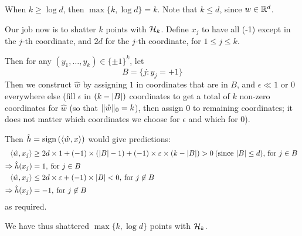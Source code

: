 \documentclass[a4paper, 12pt]{article}
\begin{document}
\begin{problem} [Problem 4]
When $k \geq \log d$, then $ \max\{k, \log d\} = k$. Note that $k \leq d$, since $w \in \mathbb{R}^d$.

Our job now is to shatter $k$ points with $\mathcal{H}_k$. Define $x_j$ to have all (-1) except in the $j$-th coordinate, and $2d$ for the $j$-th coordinate, for $1 \leq j \leq k$.

Then for any $(y_1, \ldots, y_k) \in \{\pm 1\}^k$, let \begin{equation*}
B = \{j : y_j = +1\}
\end{equation*}
Then we construct $\hat{w}$ by assigning $1$ in coordinates that are in $B$, and $\epsilon \ll 1$ or 0 everywhere else (fill $\epsilon$ in $(k-\lvert B\rvert)$ coordinates to get a total of $k$ non-zero coordinates for $\hat{w}$ (so that $\lVert\hat{w}\rVert_0 = k$), then assign 0 to remaining coordinates; it does not matter which coordinates we choose for $\epsilon$ and which for $0$).

Then $\hat{h} = \mathrm{sign}\left(\langle \hat{w}, x \rangle\right)$ would give predictions:
\begin{align*}
    \langle \hat{w}, x_j \rangle &\geq 2d \times 1 + (-1) \times (\lvert B\rvert - 1) + (-1) \times \varepsilon \times (k - \lvert B\rvert) > 0 \:\text{(since $\lvert B\rvert \leq d$), for $j \in B$}\: \\
    \Rightarrow \hat{h}(x_j) &= 1, \:\text{for $j \in B$}\: \\
    \langle \hat{w}, x_j \rangle&\leq 2d \times \varepsilon + (-1) \times \lvert B\rvert < 0,  \:\text{for $j \not \in B$}\:  \\
    \Rightarrow \hat{h}(x_j) &= -1, \:\text{for $j \not \in B$}\:
\end{align*}
as required.

We have thus shattered $\max\{k, \log d\}$ points with $\mathcal{H}_k$.
\end{problem}
\end{document}
